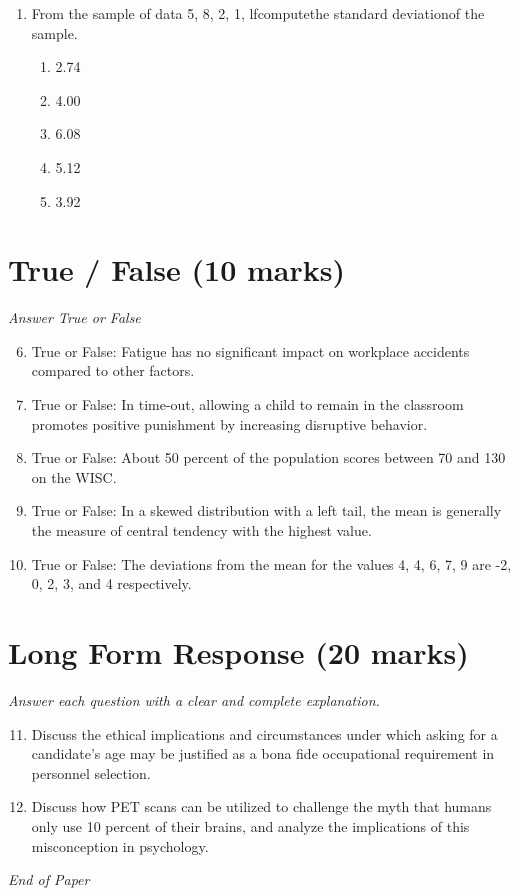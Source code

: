 \documentclass[12pt]{article}
\begin{document}
\begin{enumerate}[label=\arabic*.]
\begin{enumerate}[label=(\alph*)]
    \item Hyperthyroidism
    \item Addison's disease
    \item Low levels of melatonin
    \item An excess of testosterone
    \item Hypothyroidism
\end{enumerate}
\item From the sample of data 5, 8, 2, 1, lfcomputethe standard deviationof the sample.
\begin{enumerate}[label=(\alph*)]
    \item 2.74
    \item 4.00
    \item 6.08
    \item 5.12
    \item 3.92
\end{enumerate}
\end{enumerate}

\section*{True / False (10 marks)}
\textit{Answer True or False}
\begin{enumerate}[label=\arabic*.]
\setcounter{enumi}{5}
\item True or False: Fatigue has no significant impact on workplace accidents compared to other factors.
\item True or False: In time-out, allowing a child to remain in the classroom promotes positive punishment by increasing disruptive behavior.
\item True or False: About 50 percent of the population scores between 70 and 130 on the WISC.
\item True or False: In a skewed distribution with a left tail, the mean is generally the measure of central tendency with the highest value.
\item True or False: The deviations from the mean for the values 4, 4, 6, 7, 9 are -2, 0, 2, 3, and 4 respectively.
\end{enumerate}

\section*{Long Form Response (20 marks)}
\textit{Answer each question with a clear and complete explanation.}
\begin{enumerate}[label=\arabic*.]
\setcounter{enumi}{10}
\item Discuss the ethical implications and circumstances under which asking for a candidate's age may be justified as a bona fide occupational requirement in personnel selection.
\item Discuss how PET scans can be utilized to challenge the myth that humans only use 10 percent of their brains, and analyze the implications of this misconception in psychology.
\end{enumerate}

\vfill
\noindent\textit{End of Paper}
\end{document}

